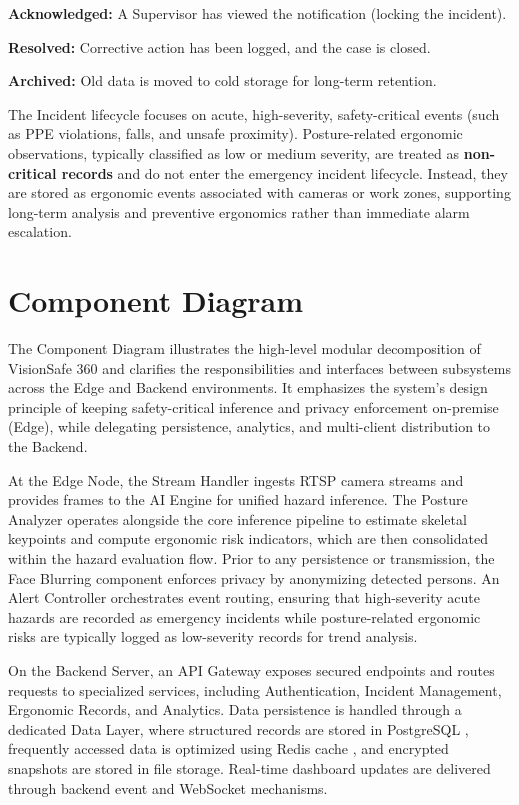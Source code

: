 \textbf{Acknowledged:} A Supervisor has viewed the notification (locking the incident).

\textbf{Resolved:} Corrective action has been logged, and the case is closed.

\textbf{Archived:} Old data is moved to cold storage for long-term retention.

The Incident lifecycle focuses on acute, high-severity, safety-critical events (such as PPE violations, falls, and unsafe proximity). Posture-related ergonomic observations, typically classified as low or medium severity, are treated as \textbf{non-critical records} and do not enter the emergency incident lifecycle. Instead, they are stored as ergonomic events associated with cameras or work zones, supporting long-term analysis and preventive ergonomics rather than immediate alarm escalation.

\section{Component Diagram}

The Component Diagram illustrates the high-level modular decomposition of VisionSafe 360 and clarifies the responsibilities and interfaces between subsystems across the Edge and Backend environments. It emphasizes the system’s design principle of keeping safety-critical inference and privacy enforcement on-premise (Edge), while delegating persistence, analytics, and multi-client distribution to the Backend.

At the Edge Node, the Stream Handler ingests RTSP camera streams and provides frames to the AI Engine for unified hazard inference. The Posture Analyzer operates alongside the core inference pipeline to estimate skeletal keypoints and compute ergonomic risk indicators, which are then consolidated within the hazard evaluation flow. Prior to any persistence or transmission, the Face Blurring component enforces privacy by anonymizing detected persons. An Alert Controller orchestrates event routing, ensuring that high-severity acute hazards are recorded as emergency incidents while posture-related ergonomic risks are typically logged as low-severity records for trend analysis.

On the Backend Server, an API Gateway exposes secured endpoints and routes requests to specialized services, including Authentication, Incident Management, Ergonomic Records, and Analytics. Data persistence is handled through a dedicated Data Layer, where structured records are stored in PostgreSQL \cite{postgres_docs}, frequently accessed data is optimized using Redis cache \cite{redis_docs}, and encrypted snapshots are stored in file storage. Real-time dashboard updates are delivered through backend event and WebSocket mechanisms.

